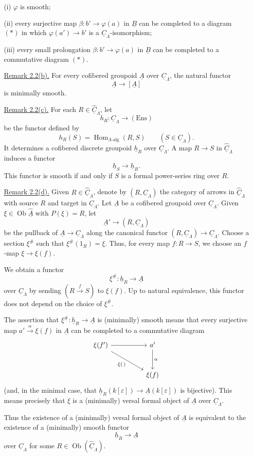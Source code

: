 (i) $\varphi$ is smooth;

(ii) every surjective map
$\beta:b'\longrightarrow\varphi(a)$ in $\underline B$ can be
completed to a diagram $(*)$ in which
$\varphi(a')\longrightarrow b'$ is a
$\underline C_\Lambda$-isomorphism;

(iii) every small prolongation
$\beta:b'\longrightarrow\varphi(a)$ in $\underline B$ can be
completed to a commutative diagram $(*)$.

\underline{Remark 2.2(b).} For every cofibered groupoid
$\underline A$ over $\underline C_\Lambda$, the natural functor
\[
 \underline A\longrightarrow[\underline A]
\]
is minimally smooth.

\underline{Remark 2.2(c).} For each
$R\in\widehat{\underline C}_\Lambda$, let
\[
 h_R:\underline C_\Lambda\longrightarrow(\mathrm{Ens})
\]
be the functor defined by
\[
 h_R(S)=\operatorname{Hom}_{\Lambda\text{-alg}}(R,S)
 \qquad(S\in\underline C_\Lambda).
\]
It determines a cofibered discrete groupoid $\underline h_R$ over
$\underline C_\Lambda$. A map $R\longrightarrow S$ in
$\widehat{\underline C}_\Lambda$ induces a functor
\[
 \underline h_S\longrightarrow\underline h_R.
\]
This functor is smooth if and only if $S$ is a formal power-series
ring over $R$.


\underline{Remark 2.2(d).} Given
$R\in\widehat{\underline C}_\Lambda$, denote by
$(R,\underline C_\Lambda)$ the category of arrows in
$\widehat{\underline C}_\Lambda$ with source $R$ and target in
$\underline C_\Lambda$. Let $\underline A$ be a cofibered groupoid
over $\underline C_\Lambda$. Given
$\xi\in\operatorname{Ob}\widehat{\underline A}$ with $P(\xi)=R$,
let
\[
 \underline A'\longrightarrow(R,\underline C_\Lambda)
\]
be the pullback of
$\underline A\longrightarrow\underline C_\Lambda$ along the
canonical functor
$(R,\underline C_\Lambda)\longrightarrow\underline C_\Lambda$.
Choose a section $\xi^\#$ such that
$\xi^\#(1_R)=\xi$. Thus, for every map
$f:R\longrightarrow S$, we choose an $f$-map
$\xi\longrightarrow\xi(f)$.

We obtain a functor
\[
 \xi^\#:\underline h_R\longrightarrow\underline A
\]
over $\underline C_\Lambda$ by sending
$(R\xrightarrow{f}S)$ to $\xi(f)$. Up to natural equivalence, this
functor does not depend on the choice of $\xi^\#$.

The assertion that
$\xi^\#:\underline h_R\longrightarrow\underline A$ is
(minimally) smooth means that every surjective map
$a'\xrightarrow{\alpha}\xi(f)$ in $\underline A$ can be completed
to a commutative diagram
\[
\begin{tikzcd}[row sep=large,column sep=huge]
 \xi(f') \arrow[r] \arrow[dr,"{\xi(\,)}"']
 & a' \arrow[d,"\alpha"]\\
 & \xi(f)
\end{tikzcd}
\]
(and, in the minimal case, that
$\underline h_R(k[\varepsilon])\longrightarrow
\underline A(k[\varepsilon])$ is bijective). This means precisely
that $\xi$ is a (minimally) versal formal object of $\underline A$
over $\underline C_\Lambda$.

Thus the existence of a (minimally) versal formal object of
$\underline A$ is equivalent to the existence of a (minimally)
smooth functor
\[
 \underline h_R\longrightarrow\underline A
\]
over $\underline C_\Lambda$ for some
$R\in\operatorname{Ob}(\widehat{\underline C}_\Lambda)$.

